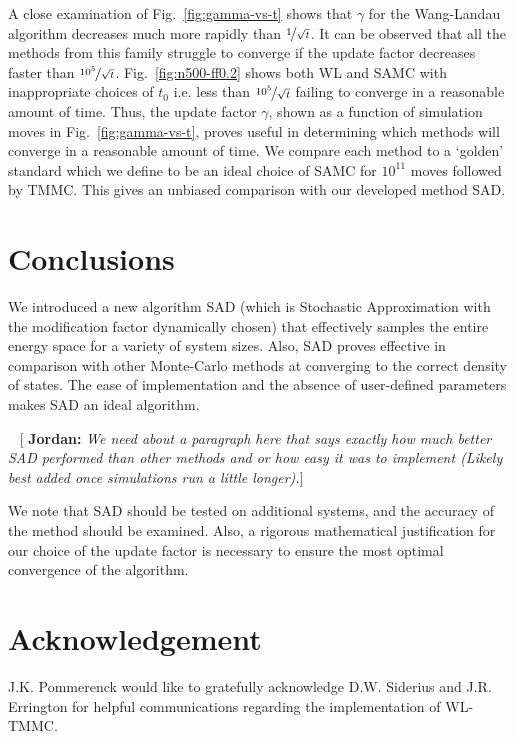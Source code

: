 \documentclass[letterpaper,twocolumn,amsmath,amssymb,pre,aps,10pt]{revtex4-1}
\newcommand{\blue}[1]{{\bf \color{blue} #1}}
\newcommand{\jpsays}[1]{{\color{red} [\blue{Jordan:} \emph{#1}]}}
\begin{document}
A close examination of Fig.~\ref{fig:gamma-vs-t} shows that $\gamma$ for the 
Wang-Landau algorithm decreases much more rapidly than $\nicefrac{1}{\sqrt{t}}$.
It can be observed that all the methods from this family struggle to converge if
the update factor decreases faster than $\nicefrac{10^5}{\sqrt{t}}$. Fig.~\ref{fig:n500-ff0.2}
shows both WL and SAMC with inappropriate choices of $t_0$ i.e. less than 
$\nicefrac{10^5}{\sqrt{t}}$ failing to converge in a reasonable amount of time.
Thus, the update factor $\gamma$, shown as a function of simulation moves
in Fig.~\ref{fig:gamma-vs-t}, proves useful in determining which methods will 
converge in a reasonable amount of time.
We compare each method to a `golden' standard which we define to be an ideal choice
of SAMC for $10^11$ moves followed by TMMC.  This gives an unbiased comparison with
our developed method SAD.

\section{Conclusions}

We introduced a new algorithm SAD (which is Stochastic Approximation
with the modification factor dynamically chosen) that effectively
samples the entire energy space for a variety of system sizes.  Also,
SAD proves effective in comparison with other Monte-Carlo methods at
converging to the correct density of states.  The ease of
implementation and the absence of user-defined parameters makes SAD an
ideal algorithm.

~\jpsays{We need about a paragraph here that says exactly how much
better SAD performed than other methods and or how easy it was to
implement (Likely best added once simulations run a little longer).}

We note that SAD should be tested on additional systems, and the
accuracy of the method should be examined.  Also, a rigorous
mathematical justification for our choice of the update factor is
necessary to ensure the most optimal convergence of the algorithm.

\section{Acknowledgement}

J.K. Pommerenck would like to gratefully acknowledge D.W. Siderius and
J.R. Errington for helpful communications regarding the implementation
of WL-TMMC.

\end{document}
